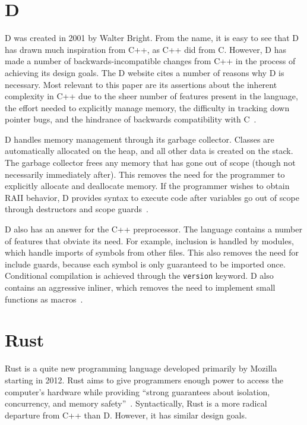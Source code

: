 \documentclass[draftcopy]{srpaper}
\begin{document}
\section{D}

D was created in 2001 by Walter Bright. From the name, it is easy to see that D
has drawn much inspiration from C++, as C++ did from C. However, D has made a
number of backwards-incompatible changes from C++ in the process of achieving
its design goals. The D website cites a number of reasons why D is necessary.
Most relevant to this paper are its assertions about the inherent complexity in
C++ due to the sheer number of features present in the language, the effort
needed to explicitly manage memory, the difficulty in tracking down pointer
bugs, and the hindrance of backwards compatibility with C~\cite{Doverview}.

D handles memory management through its garbage collector. Classes are
automatically allocated on the heap, and all other data is created on the
stack. The garbage collector frees any memory that has gone out of scope
(though not necessarily immediately after). This removes the need for the
programmer to explicitly allocate and deallocate memory. If the programmer
wishes to obtain RAII behavior, D provides syntax to execute code after
variables go out of scope through destructors and scope guards~\cite{cppford}.

D also has an answer for the C++ preprocessor. The language contains a number
of features that obviate its need. For example, inclusion is handled by
modules, which handle imports of symbols from other files. This also removes
the need for include guards, because each symbol is only guaranteed to be
imported once. Conditional compilation is achieved through the
\texttt{version} keyword. D also contains an aggressive inliner, which removes
the need to implement small functions as macros~\cite{pretod}.

\section{Rust}

Rust is a quite new programming language developed primarily by Mozilla
starting in 2012. Rust aims to give programmers enough power to access the
computer's hardware while providing ``strong guarantees about isolation,
concurrency, and memory safety''~\cite{Matsakis:2014:RL:2663171.2663188}.
Syntactically, Rust is a more radical departure from C++ than D. However, it
has similar design goals.
\end{document}
